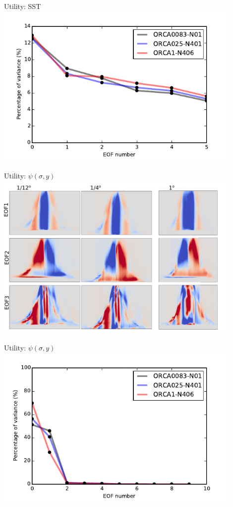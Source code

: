 \documentclass{beamer}
\begin{document}
\begin{frame}{Utility: SST}
\centering \includegraphics[width=0.9\textwidth]{SST_EOFCut2.png}
\end{frame}
\begin{frame}{Utility: $\psi(\sigma, y)$}
\vspace{-0.5cm}
\centering \includegraphics[width=0.9\textwidth]{mocsigUtility1_2_3_P.png}
\end{frame}

\begin{frame}{Utility: $\psi(\sigma, y)$}
\centering \includegraphics[width=0.9\textwidth]{mocsigF_EOF_Cut2.png}
\end{frame}
\end{document}
